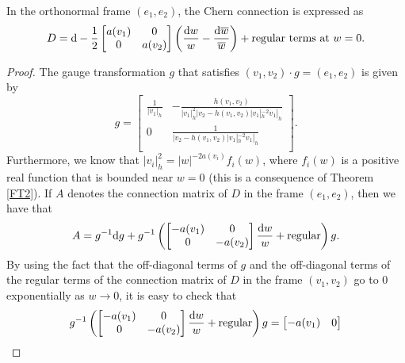 \begin{Lemma} In the orthonormal frame $(e_1,e_2)$, the Chern connection is expressed as
\begin{equation*}
 D={\rm d} - \frac{1}{2}\begin{bmatrix} a(v_1) & 0 \\
 0 & a(v_2) \\
 \end{bmatrix}\left(\frac{{\rm d}w}{w}- \frac{{\rm d}\overline{w}}{\overline{w}}\right) + \text{regular terms at $w=0$}.
\end{equation*}

\end{Lemma}
\begin{proof}
The gauge transformation $g$ that satisfies $(v_1,v_2)\cdot g=(e_1,e_2)$ is given by
\begin{equation*}
 g=\begin{bmatrix}
 \frac{1}{|v_1|_h}&-\frac{h(v_1,v_2)}{|v_1|^2_h|v_2-h(v_1,v_2)|v_1|_h^{-2}v_1|_h}\\
 0 & \frac{1}{|v_2-h(v_1,v_2)|v_1|_h^{-2}v_1|_h}\\
 \end{bmatrix}.
\end{equation*}
Furthermore, we know that $|v_i|_h^2=|w|^{-2a(v_i)}f_i(w)$, where $f_i(w)$ is a positive real function that is bounded near $w=0$ (this is a consequence of Theorem \ref{FT2}). If $A$ denotes the connection matrix of $D$ in the frame $(e_1,e_2)$, then we have that
\begin{equation*}
 A=g^{-1}{\rm d}g + g^{-1}\left(\begin{bmatrix} -a(v_1) & 0 \\
 0 & -a(v_2) \\
 \end{bmatrix}\frac{{\rm d}w}{w} + \text{regular}\right)g.
\end{equation*}
By using the fact that the off-diagonal terms of $g$ and the off-diagonal terms of the regular terms of the connection matrix of $D$ in the frame $(v_1,v_2)$ go to 0 exponentially as $w\to 0$, it is easy to check that
\begin{equation*}
 g^{-1}\left(\begin{bmatrix} -a(v_1) & 0 \\
 0 & -a(v_2) \\
 \end{bmatrix}\frac{{\rm d}w}{w} + \text{regular}\right)g=\begin{bmatrix} -a(v_1) & 0 \\

\end{bmatrix}
\end{equation*}
\end{proof}
